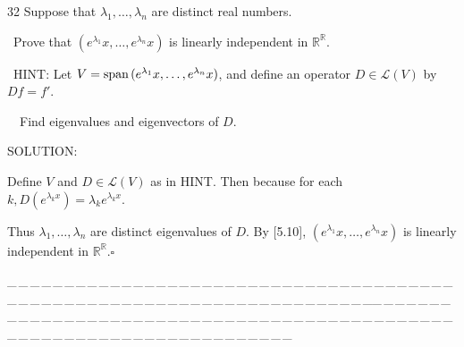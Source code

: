 \documentclass[a4paper, 11pt, UTF8]{article}
\def\Spn{\textup{span}\,}
\def\Lm{\mathcal{L}}
\def\Rbb{\mathbb{R}}
\begin{document}
\begin{large}
{\timesbf\Large 32} {\timessl\Large 
Suppose that $\lambda_1,\dots,\lambda_n$ are distinct real numbers.}\par\quad\,
{\timessl\Large Prove that $(e^{\lambda_1}x,\dots,e^{\lambda_n}x)$ is linearly independent in $\Rbb^\Rbb$.}\par\quad\,
H{\small INT}: {\timessl\normalsize Let $V=\Spn(e^{\lambda_1}x,\dots,e^{\lambda_n}x)$, and define an operator $D\in\Lm(V)$ by $Df = f'$.}\par\qquad\quad\,\,\,\,
{\timessl\normalsize Find eigenvalues and eigenvectors of $D$.}\par
{\timesbf S\footnotesize{OLUTION:}}\par\quad
Define $V$ and $D\in\Lm(V)$ as in H{\small INT}. Then because for each $k, D(e^{\lambda_k x})=\lambda_k e^{\lambda_k x}.$\par\quad
Thus $\lambda_1,\dots,\lambda_n$ are distinct eigenvalues of $D.$ By [5.10], $(e^{\lambda_1}x,\dots,e^{\lambda_n}x)$ is linearly independent in $\Rbb^\Rbb$.\quad$\square$\par
{\tiny \_\,\_\,\_\,\_\,\_\,\_\,\_\,\_\,\_\,\_\,\_\,\_\,\_\,\_\,\_\,\_\,\_\,\_\,\_\,\_\,\_\,\_\,\_\,\_\,\_\,\_\,\_\,\_\,\_\,\_\,\_\,\_\,\_\,\_\,\_\,\_\,\_\,\_\,\_\,\_\,\_\,\_\,\_\,\_\,\_\,\_\,\_\,\_\,\_\,\_\,\_\,\_\,\_\,\_\,\_\,\_\,\_\,\_\,\_\,\_\,\_\,\_\,\_\,\_\,\_\,\_\,\_\,\_\,\_\,\_\,\_\_\,\_\,\_\,\_\,\_\,\_\,\_\,\_\,\_\,\_\,\_\,\_\,\_\,\_\,\_\,\_\,\_\,\_\,\_\,\_\,\_\,\_\,\_\,\_\,\_\,\_\,\_\,\_\,\_\,\_\,\_\,\_\,\_\,\_\,\_\,\_\,\_\,\_\,\_\,\_\,\_\,\_\,\_\,\_\,\_\,\_\,\_\,\_\,\_\,\_\,\_\,\_\,\_\,\_\,\_\,\_\,\_\,\_\,\_\,\_\,\_\,\_\,\_\,\_\,\_\,\_\,\_\,\_\,\_\,\_\,\_\par}


\end{large}
\end{document}
